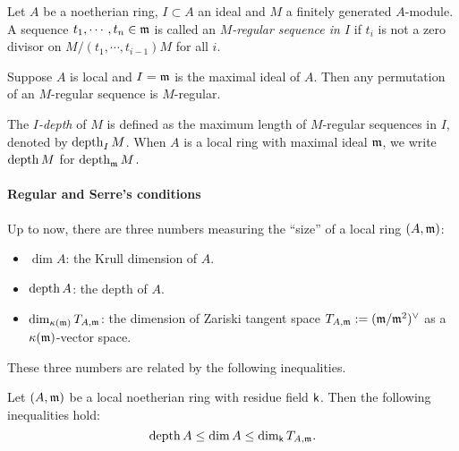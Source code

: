     \begin{definition}
        Let $A$ be a noetherian ring, $I \subset A$ an ideal and $M$ a finitely generated $A$-module.
        A sequence $t_1,\cdots,t_n\in {\mathfrak{m}}$ is called an \textit{$M$-regular sequence in $I$} if $t_i$ is not a zero divisor on $M/(t_1,\cdots,t_{i-1})M$ for all $i$. 
    \end{definition}

    \begin{proposition}
        Suppose $A$ is local and $I = {\mathfrak{m}}$ is the maximal ideal of $A$.
        Then any permutation of an $M$-regular sequence is $M$-regular.
    \end{proposition}

    \begin{definition}
        The \textit{$I$-depth} of $M$ is defined as the maximum length of $M$-regular sequences in $I$, denoted by $\operatorname{depth}_I M$. 
        When $A$ is a local ring with maximal ideal ${\mathfrak{m}}$, we write $\operatorname{depth} M$ for $\operatorname{depth}_{{\mathfrak{m}}} M$.
    \end{definition}


    \paragraph{Regular and Serre's conditions}
    Up to now, there are three numbers measuring the ``size'' of a local ring $(A,{\mathfrak{m}})$:
    \begin{itemize}
        \item $\dim A$: the Krull dimension of $A$.
        \item $\operatorname{depth} A$: the depth of $A$.
        \item $\dim_{{\kappa}({\mathfrak{m}})} T_{A,{\mathfrak{m}}}$: the dimension of Zariski tangent space $T_{A,{\mathfrak{m}}} := ({\mathfrak{m}}/{\mathfrak{m}}^2)^\lor$ as a ${{\kappa}({\mathfrak{m}})}$-vector space.
    \end{itemize}

    These three numbers are related by the following inequalities.
    \begin{proposition}
        Let $(A,{\mathfrak{m}})$ be a local noetherian ring with residue field ${\mathsf{k}}$.
        Then the following inequalities hold:
        \[ \operatorname{depth} A \leq \dim A \leq \dim_{\mathsf{k}} T_{A,{\mathfrak{m}}}. \]
    \end{proposition}

